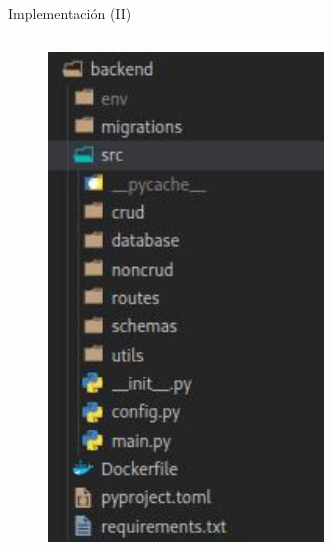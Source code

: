 \documentclass[aspectratio=169,xcolor=dvipsnames]{beamer}
\begin{document}
\begin{frame}{Implementación (II)}
\begin{columns}
			\begin{column}{0.4\textwidth}
				\begin{figure}[h!]
					\begin{center}
						\includegraphics[width=0.65\textwidth]{img/folder_structure.jpg}
					\end{center}
				\end{figure}
			\end{column}
		\end{columns}
	\end{frame}
	
	
\end{document}
